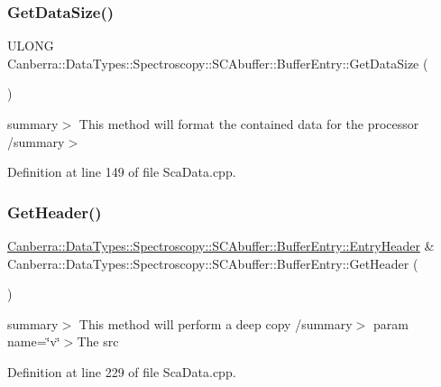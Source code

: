 \subsubsection{\texorpdfstring{Get\+Data\+Size()}{GetDataSize()}}
{\footnotesize\ttfamily U\+L\+O\+NG Canberra\+::\+Data\+Types\+::\+Spectroscopy\+::\+S\+C\+Abuffer\+::\+Buffer\+Entry\+::\+Get\+Data\+Size (\begin{DoxyParamCaption}{ }\end{DoxyParamCaption})}

summary$>$ This method will format the contained data for the processor /summary$>$ 

Definition at line 149 of file Sca\+Data.\+cpp.

\mbox{\label{class_canberra_1_1_data_types_1_1_spectroscopy_1_1_s_c_abuffer_1_1_buffer_entry_a273153da4624719a9034b671109b0a14_a273153da4624719a9034b671109b0a14}} 
\subsubsection{\texorpdfstring{Get\+Header()}{GetHeader()}}
{\footnotesize\ttfamily \hyperlink{class_canberra_1_1_data_types_1_1_spectroscopy_1_1_s_c_abuffer_1_1_buffer_entry_de/d72/struct_canberra_1_1_data_types_1_1_spectroscopy_1_1_s_c_abuffer_1_1_buffer_entry_1_1_entry_header_tag}{Canberra\+::\+Data\+Types\+::\+Spectroscopy\+::\+S\+C\+Abuffer\+::\+Buffer\+Entry\+::\+Entry\+Header} \& Canberra\+::\+Data\+Types\+::\+Spectroscopy\+::\+S\+C\+Abuffer\+::\+Buffer\+Entry\+::\+Get\+Header (\begin{DoxyParamCaption}{ }\end{DoxyParamCaption})}

summary$>$ This method will perform a deep copy /summary$>$ param name=\char`\"{}v\char`\"{}$>$The src

Definition at line 229 of file Sca\+Data.\+cpp.

\mbox{\label{class_canberra_1_1_data_types_1_1_spectroscopy_1_1_s_c_abuffer_1_1_buffer_entry_aeb09ea98560f5f1b4cf3e5819e3716a4_aeb09ea98560f5f1b4cf3e5819e3716a4}} 
